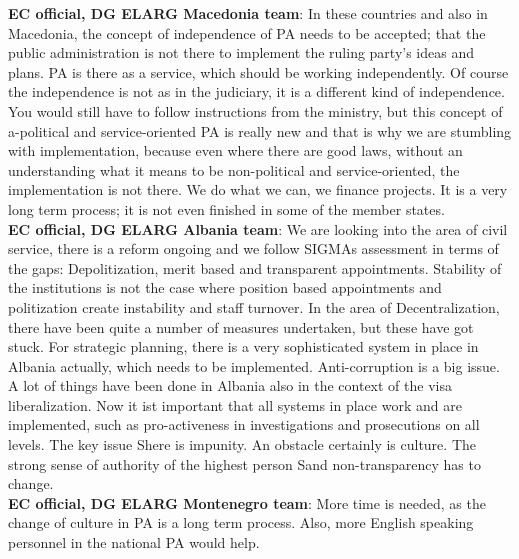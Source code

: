 \textbf{EC official, DG ELARG Macedonia team}: In these countries and also in Macedonia, the concept of independence of PA needs to be accepted; that the public administration is not there to implement the ruling party's ideas and plans. PA is there as a service, which should be working independently. Of course the independence is not as in the judiciary, it is a different kind of independence. You would still have to follow instructions from the ministry, but this concept of a-political and service-oriented PA is really new and that is why we are stumbling with implementation, because even where there are good laws, without an understanding what it means to be non-political and service-oriented, the implementation is not there. We do what we can, we finance projects. It is a very long term process; it is not even finished in some of the member states.\\ 
\textbf{EC official, DG ELARG Albania team}: We are looking into the area of civil service, there is a reform ongoing and we follow SIGMAs assessment in terms of the gaps: Depolitization, merit based and transparent appointments. Stability of the institutions is not the case where position based appointments and politization create instability and staff turnover. In the area of Decentralization, there have been quite a number of measures undertaken, but these have got stuck. For strategic planning, there is a very sophisticated system in place in Albania actually, which needs to be implemented. Anti-corruption is a big issue. A lot of things have been done in Albania also in the context of the visa liberalization. Now it ist important that all systems in place work and are implemented, such as pro-activeness in investigations and prosecutions on all levels. The key issue Shere is impunity. An obstacle certainly is culture. The strong sense of authority of the highest person Sand non-transparency has to change.\\
\textbf{EC official, DG ELARG Montenegro team}: More time is needed, as the change of culture in PA is a long term process. Also, more English speaking personnel in the national PA would help. \\
